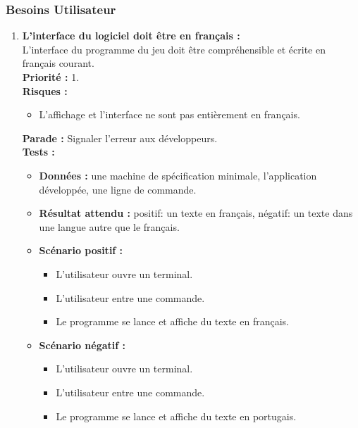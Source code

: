 \documentclass{article}
\begin{document}
\subsubsection{Besoins Utilisateur}
\begin{enumerate}

    \item \textbf{L'interface du logiciel doit être en français :} \\
    L'interface du programme du jeu doit être compréhensible et écrite en français courant. \\
    \textbf{Priorité :} 1. \\
    \textbf{Risques :} 
    \begin{itemize}
        \item L'affichage et l'interface ne sont pas entièrement en français. \\
    \end{itemize}
    \textbf{Parade :} Signaler l'erreur aux développeurs.\\
    \textbf{Tests :}
    \begin{itemize}
        \item \textbf{Données :} une machine de spécification minimale, l'application développée, une ligne de commande.
        \item \textbf{Résultat attendu :} positif: un texte en français, négatif: un texte dans une langue autre que le français.
        \item \textbf{Scénario positif :}
        \begin{itemize}
            \item L’utilisateur ouvre un terminal.
            \item L’utilisateur entre une commande.
            \item Le programme se lance et affiche du texte en français.
        \end{itemize}
        \item \textbf{Scénario négatif :}
        \begin{itemize}
            \item L’utilisateur ouvre un terminal.
            \item L’utilisateur entre une commande.
            \item Le programme se lance et affiche du texte en portugais.
        \end{itemize}
    \end{itemize}
    

\end{enumerate}
\end{document}
